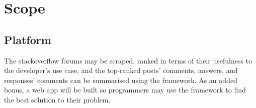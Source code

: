 



\vspace{1cm}
\section{Scope}
\subsection*{Platform}
The stackoverflow forums may be scraped, ranked in terms of their usefulness to the developer's use case, and the top-ranked posts' comments, answers, and responses' comments can be summarised using the framework. As an added bonus, a web app will be built so programmers may use the framework to find the best solution to their problem.

